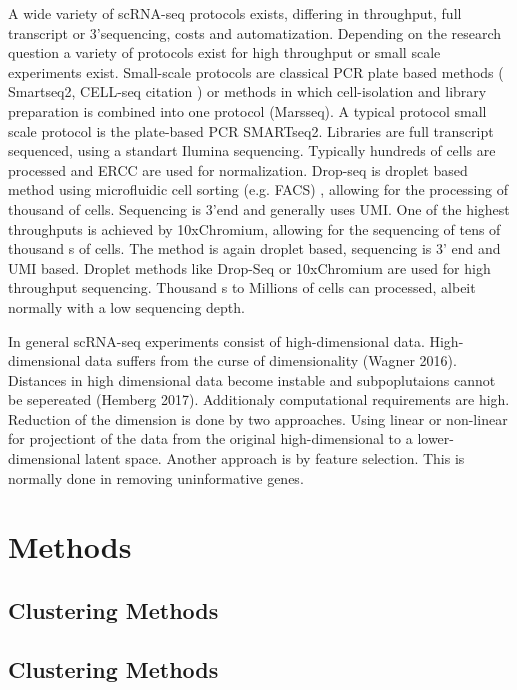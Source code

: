 \documentclass[11pt, a4paper]{article}\usepackage[]{graphicx}\usepackage[]{color}
\begin{document}
A wide variety of scRNA-seq protocols exists, differing in throughput, full transcript or 3'sequencing, costs and automatization.
Depending on the research question a variety of protocols exist for high throughput or small scale experiments exist. Small-scale protocols are classical PCR plate based methods ( Smartseq2, CELL-seq citation ) or methods in which cell-isolation and library preparation is combined into one protocol (Marsseq). A typical protocol small scale protocol is the plate-based PCR SMARTseq2.  Libraries are full transcript sequenced, using a standart Ilumina sequencing. Typically hundreds of cells are processed and ERCC are used for normalization. Drop-seq is droplet based method using microfluidic cell sorting (e.g. FACS) , allowing for the processing of thousand of cells. Sequencing is 3'end and generally uses UMI. One of the highest throughputs is achieved by 10xChromium, allowing for the sequencing of tens of thousand s of cells. The method is again droplet based, sequencing is 3' end and UMI based. 
Droplet methods like Drop-Seq or 10xChromium are used for high throughput sequencing. Thousand s to Millions of cells can processed, albeit normally with a low sequencing depth.

In general scRNA-seq experiments consist of high-dimensional data. High-dimensional data suffers from the curse of dimensionality (Wagner 2016). Distances in high dimensional data become instable and subpoplutaions cannot be sepereated (Hemberg 2017). Additionaly computational requirements are high. Reduction of the dimension is done by two approaches. Using linear or non-linear for projectiont of the data from the original high-dimensional to a lower-dimensional latent space. Another approach is by feature selection. This is normally done in removing uninformative genes. 




\section{Methods}

\subsection{Clustering Methods}

\subsection{Clustering Methods}
\end{document}
